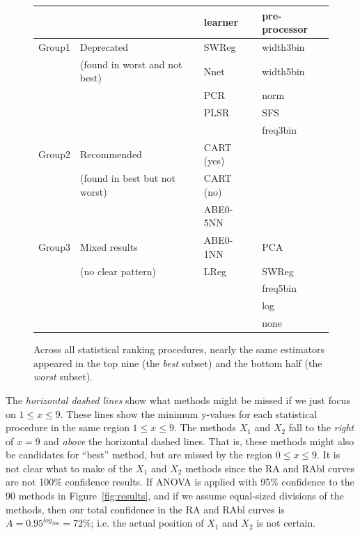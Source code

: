 \documentclass{sig-alternate}
\newcommand{\fig}[1]{Figure~\ref{fig:#1}}
\begin{document}
\begin{figure}
\small
\begin{center}
 \begin{tabular}{l|l|ll}
\multicolumn{2}{c}{~}                      & learner    & pre-processor \\\hline
Group1& Deprecated           & SWReg      & width3bin\\
&(found in worst and not best)& Nnet& width5bin\\
&                      & PCR        & norm\\
&                      & PLSR       & SFS\\
&                      &            & freq3bin\\\hline
Group2&Recommended           & CART (yes) &\\
&(found in best 
but not worst)        & CART (no)  &\\
&                      & ABE0-5NN   &\\\hline
Group3&Mixed results         & ABE0-1NN   & PCA\\ 
&(no clear pattern)    & LReg       & SWReg\\
&                      &            & freq5bin\\
&                      &            & log\\
&                      &            & none
                    \end{tabular}
\end{center}
\caption{Across all statistical ranking procedures,
nearly the same estimators appeared in the top nine (the {\em best}
subset) and the bottom half (the {\em worst} subset).
}\label{fig:best}
\end{figure}



The {\em horizontal dashed lines}  show
what methods might be missed if we just focus on $1\le x \le 9$.
These lines  show the minimum y-values
for each statistical procedure in the same region $1\le x \le 9$.
The methods  $X_1$
and $X_2$ fall to the {\em right}  of $x=9$ and {\em above} 
the horizontal dashed lines. 
That is, these  methods might also be candidates for ``best'' method,
but are missed by the region $0\le x \le 9$. 
It is not clear what to make
of the $X_1$ and $X_2$
methods since the RA and RAbl curves are not 100\% confidence results.
If ANOVA
is applied with 95\% confidence to the 90 methods in \fig{results}, and if
we assume equal-sized divisions of the methods, then our total confidence
in the RA and RAbl curves is $A=0.95^{log_290}=72\%$; i.e.  the actual
position of $X_1$ and $X_2$ is not certain.
\end{document}
